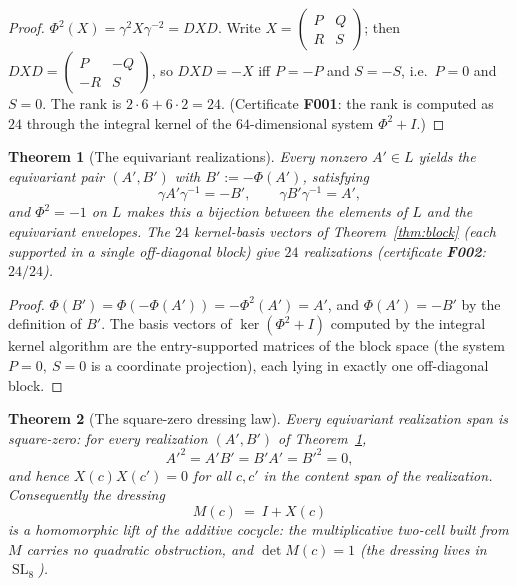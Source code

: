 \documentclass[11pt]{article}
\newcommand{\R}{\mathbb R}
\newcommand{\SL}{\operatorname{SL}}
\newtheorem{theorem}{Theorem}[section]
\begin{document}
\begin{proof}
$\Phi^2(X)=\gamma^2X\gamma^{-2}=DXD$. Write
$X=\left(\begin{smallmatrix}P&Q\\R&S\end{smallmatrix}\right)$; then
$DXD=\left(\begin{smallmatrix}P&-Q\\-R&S\end{smallmatrix}\right)$, so
$DXD=-X$ iff $P=-P$ and $S=-S$, i.e.\ $P=0$ and $S=0$. The rank is
$2\cdot6+6\cdot2=24$. (Certificate \textbf{F001}: the rank is
computed as $24$ through the integral kernel of the $64$-dimensional
system $\Phi^2+I$.)
\end{proof}

\begin{theorem}[The equivariant realizations]\label{thm:realizations}
Every nonzero $A'\in L$ yields the equivariant pair
$(A',B')$ with $B':=-\Phi(A')$, satisfying
\[
\gamma A'\gamma^{-1}=-B',\qquad \gamma B'\gamma^{-1}=A',
\]
and $\Phi^2=-1$ on $L$ makes this a bijection between the elements of
$L$ and the equivariant envelopes. The $24$ kernel-basis vectors of
Theorem~\ref{thm:block} (each supported in a single off-diagonal
block) give $24$ realizations (certificate \textbf{F002}: $24/24$).
\end{theorem}

\begin{proof}
$\Phi(B')=\Phi(-\Phi(A'))=-\Phi^2(A')=A'$, and
$\Phi(A')=-B'$ by the definition of $B'$. The basis vectors of
$\ker(\Phi^2+I)$ computed by the integral kernel algorithm are the
entry-supported matrices of the block space (the system
$P=0,\ S=0$ is a coordinate projection), each lying in exactly one
off-diagonal block.
\end{proof}

\begin{theorem}[The square-zero dressing law]\label{thm:square-zero}
Every equivariant realization span is square-zero: for every
realization $(A',B')$ of Theorem~\ref{thm:realizations},
\[
A'^2=A'B'=B'A'=B'^2=0,
\]
and hence $X(c)X(c')=0$ for all $c,c'$ in the content span of the
realization. Consequently the dressing
\[
M(c)\ =\ I+X(c)
\]
is a \emph{homomorphic lift} of the additive cocycle: the
multiplicative two-cell built from $M$ carries no quadratic
obstruction, and $\det M(c)=1$ (the dressing lives in $\SL_8$).
\end{theorem}
\end{document}

